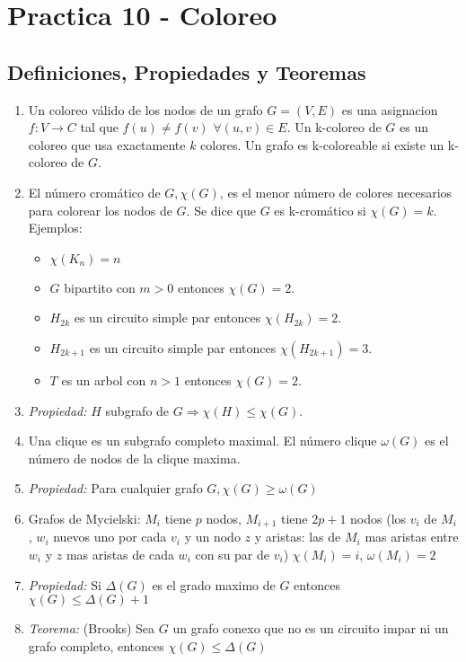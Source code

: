 \section{Practica 10 - Coloreo}
\subsection{Definiciones, Propiedades y Teoremas}
\begin{enumerate}
\item Un coloreo válido de los nodos de un grafo $G=(V,E)$ es una asignacion $f:V\rightarrow C$ tal que $f(u) \neq f(v)$ $\forall(u,v)\in E$. Un k-coloreo de $G$ es un coloreo que usa exactamente $k$ colores. Un grafo es k-coloreable si existe un k-coloreo de $G$.
\item El número cromático de $G, \chi(G)$, es el menor número de colores necesarios para colorear los nodos de $G$. Se dice que $G$ es k-cromático si $\chi(G) = k$. Ejemplos:
    \begin{itemize}
        \item $\chi(K_{n}) = n$
        \item $G$ bipartito con $m>0$ entonces $\chi(G) = 2$.
        \item $H_{2k}$ es un circuito simple par entonces $\chi(H_{2k}) = 2$.
        \item $H_{2k+1}$ es un circuito simple par entonces $\chi(H_{2k+1}) = 3$.
        \item $T$ es un arbol con $n>1$ entonces $\chi(G) = 2$.
    \end{itemize}
\item \textit{Propiedad:} $H$ subgrafo de $G \Rightarrow \chi(H) \leq \chi(G)$.
\item Una clique es un subgrafo completo maximal. El número clique $\omega(G)$ es el número de nodos de la clique maxima.
\item \textit{Propiedad:} Para cualquier grafo $G, \chi(G) \geq \omega(G)$
\item Grafos de Mycielski: $M_{i}$ tiene $p$ nodos, $M_{i+1}$ tiene $2p+1$ nodos (los $v_{i}$ de $M_{i}$, $w_{i}$ nuevos uno por cada $v_{i}$ y un nodo $z$ y aristas: las de $M_{i}$ mas aristas entre $w_{i}$ y $z$ mas aristas de cada $w_{i}$ con su par de $v_{i}$) $\chi(M_{i})=i$, $\omega(M_{i})=2$
\item \textit{Propiedad:} Si $\Delta(G)$ es el grado maximo de $G$ entonces $\chi(G) \leq \Delta(G)+1$
\item \textit{Teorema:} (Brooks) Sea $G$ un grafo conexo que no es un circuito impar ni un grafo completo, entonces $\chi(G) \leq \Delta(G)$

\end{enumerate}
